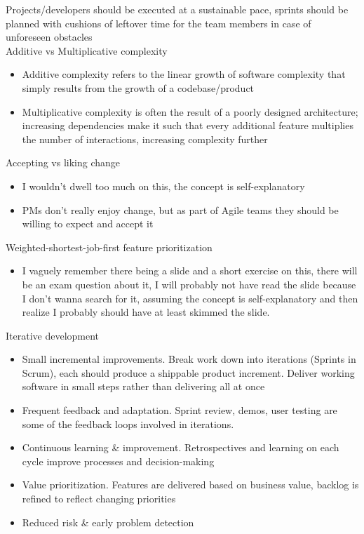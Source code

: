 \documentclass[10pt]{article}
\begin{document}
Projects/developers should be executed at a sustainable pace, sprints should be planned with cushions of leftover time for the team members in case of unforeseen obstacles\\
Additive vs Multiplicative complexity
\begin{itemize}
\item Additive complexity refers to the linear growth of software complexity that simply results from the growth of a codebase/product
\item Multiplicative complexity is often the result of a poorly designed architecture; increasing dependencies make it such that every additional feature multiplies the number of interactions, increasing complexity further
\end{itemize}
Accepting vs liking change
\begin{itemize}
\item I wouldn't dwell too much on this, the concept is self-explanatory
\item PMs don't really enjoy change, but as part of Agile teams they should be willing to expect and accept it
\end{itemize}
Weighted-shortest-job-first feature prioritization
\begin{itemize}
\item I vaguely remember there being a slide and a short exercise on this, there will be an exam question about it, I will probably not have read the slide because I don't wanna search for it, assuming the concept is self-explanatory and then realize I probably should have at least skimmed the slide.
\end{itemize}
Iterative development
\begin{itemize}
\item Small incremental improvements. Break work down into iterations (Sprints in Scrum), each should produce a shippable product increment. Deliver working software in small steps rather than delivering all at once
\item Frequent feedback and adaptation. Sprint review, demos, user testing are some of the feedback loops involved in iterations.
\item Continuous learning \& improvement. Retrospectives and learning on each cycle improve processes and decision-making
\item Value prioritization. Features are delivered based on business value, backlog is refined to reflect changing priorities
\item Reduced risk \& early problem detection
\end{itemize}
\end{document}
